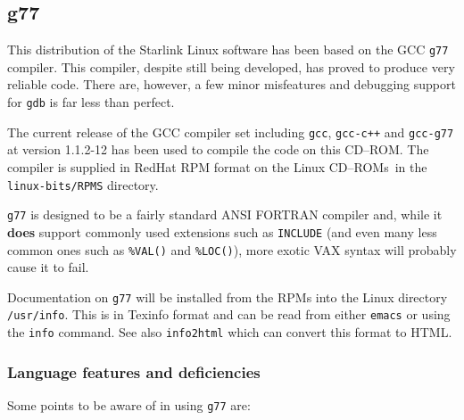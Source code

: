 \documentclass[twoside,11pt]{article}
\newcommand{\xlabel}[1]{}
\renewcommand{\_}{\texttt{\symbol{95}}}
\newcommand{\cdrom}{CD--ROM}
\newcommand{\cdrom}{CD-ROM}
\newcommand{\cdroms}{CD--ROMs}
\newcommand{\cdroms}{CD-ROMs}
\begin{document}
\subsection{\xlabel{g77}g77}
\label{g77}

This distribution of the Starlink Linux software has been based on the GCC
\texttt{g77} compiler.  This compiler, despite still being developed,
has proved to produce very reliable code.  There are, however, a few
minor misfeatures and debugging support for \texttt{gdb} is far less
than perfect.

The current release of the GCC compiler set including \texttt{gcc}, 
\texttt{gcc-c++} and \texttt{gcc-g77} at version 1.1.2-12 has been
used to compile the code on this \cdrom.  The compiler is supplied in
RedHat RPM format on the Linux \cdroms\ in the \texttt{linux-bits/RPMS} 
directory.

\texttt{g77} is designed to be a fairly standard ANSI FORTRAN compiler
and, while it \textbf{does} support commonly used extensions such as
\texttt{INCLUDE} (and even many less common ones such as \texttt{\%VAL()} 
and \texttt{\%LOC()}), more exotic VAX syntax will probably cause it to fail.

Documentation on \texttt{g77} will be installed from the RPMs into the
Linux directory \texttt{/usr/info}.  This is in Texinfo format and can
be read from either \texttt{emacs} or using the \texttt{info} command.
See also \texttt{info2html} which can convert this format to HTML.

\subsubsection{Language features and deficiencies}

Some points to be aware of in using \texttt{g77} are:
\end{document}
